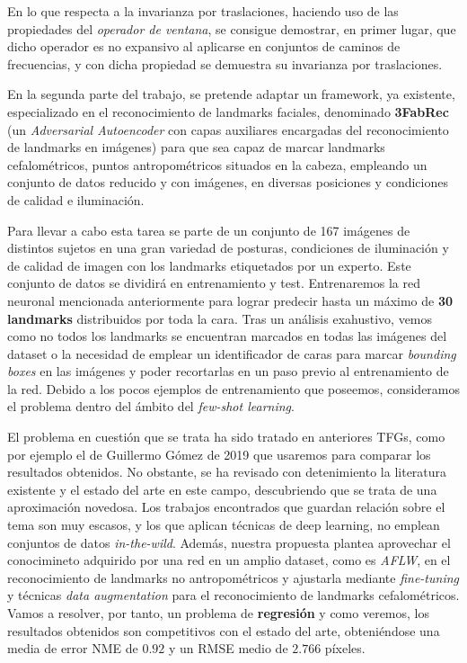 \medskip

\noindent En lo que respecta a la invarianza por traslaciones, haciendo uso de las propiedades del \textit{operador de ventana}, se consigue demostrar, en primer lugar, que dicho operador es no expansivo al aplicarse en conjuntos de caminos de frecuencias, y con dicha propiedad se demuestra su invarianza por traslaciones.

\medskip

\noindent En la segunda parte del trabajo, se pretende adaptar un framework, ya existente, especializado en el reconocimiento de landmarks faciales, denominado \textbf{3FabRec} (un \textit{Adversarial Autoencoder} con capas auxiliares encargadas del reconocimiento de landmarks en imágenes) para que sea capaz de marcar landmarks cefalométricos, puntos antropométricos situados en la cabeza, empleando un conjunto de datos reducido y con imágenes, en diversas posiciones y condiciones de calidad e iluminación.

\medskip

\noindent Para llevar a cabo esta tarea se parte de un conjunto de 167 imágenes de distintos sujetos en una gran variedad de posturas, condiciones de iluminación y de calidad de imagen con los landmarks etiquetados por un experto. Este conjunto de datos se dividirá en entrenamiento y test. Entrenaremos la red neuronal mencionada anteriormente para lograr predecir hasta un máximo de \textbf{30 landmarks} distribuidos por toda la cara. Tras un análisis exahustivo, vemos como no todos los landmarks se encuentran marcados en todas las imágenes del dataset o la necesidad de emplear un identificador de caras para marcar \textit{bounding boxes} en las imágenes y poder recortarlas en un paso previo al entrenamiento de la red. Debido a los pocos ejemplos de entrenamiento que poseemos, consideramos el problema dentro del ámbito del \textit{few-shot learning}.

\medskip

\noindent El problema en cuestión que se trata ha sido tratado en anteriores TFGs, como por ejemplo el de Guillermo Gómez de 2019 que usaremos para comparar los resultados obtenidos. No obstante, se ha revisado con detenimiento la literatura existente y el estado del arte en este campo, descubriendo que se trata de una aproximación novedosa. Los trabajos encontrados que guardan relación sobre el tema son muy escasos, y los que aplican técnicas de deep learning, no emplean conjuntos de datos \textit{in-the-wild}. Además, nuestra propuesta plantea aprovechar el conocimineto adquirido por una red en un amplio dataset, como es \textit{AFLW}, en el reconocimiento de landmarks no antropométricos y ajustarla mediante \textit{fine-tuning}  y técnicas \textit{data augmentation}  para el reconocimiento de landmarks cefalométricos. Vamos a resolver, por tanto, un problema de \textbf{regresión} y como veremos, los resultados obtenidos son competitivos con el estado del arte, obteniéndose una media de error NME de $0.92$ y un RMSE medio de $2.766$ píxeles.

